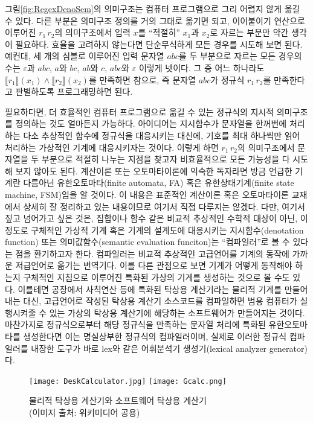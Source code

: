 그림\;\ref{fig:RegexDenoSem}의 의미구조는 컴퓨터 프로그램으로 그리
어렵지 않게 옮길 수 있다. 다른 부분은 의미구조 정의를 거의 그대로
옮기면 되고, 이이붙이기 연산으로 이루어진 $r_1\,r_2$의 의미구조에서
입력 $x$를 ``적절히'' $x_1$과 $x_2$로 자르는 부분만 약간 생각이 필요하다.
효율을 고려하지 않는다면 단순무식하게 모든 경우를 시도해 보면 된다.
예컨대, 세 개의 심볼로 이루어진 입력 문자열 $abc$를 두 부분으로 자르는
모든 경우의 수는 $\varepsilon$과 $abc$, $a$와 $bc$, $ab$와 $c$, $abc$와
$\varepsilon$ 이렇게 넷이다. 그 중 어느 하나라도
$\llbracket r_1\rrbracket(x_1) \land \llbracket r_2\rrbracket(x_2)$를
만족하면 참으로, 즉 문자열 $abc$가 정규식 $r_1\,r_2$를 만족한다고
판별하도록 프로그래밍하면 된다.

필요하다면, 더 효율적인 컴퓨터 프로그램으로 옮길 수 있는 정규식의
지시적 의미구조를 정의하는 것도 얼마든지 가능하다. 아이디어는
지시함수가 문자열을 한꺼번에 처리하는 다소 추상적인 함수에 정규식을
대응시키는 대신에, 기호를 최대 하나씩만 읽어 처리하는 가상적인 기계에
대응시키자는 것이다. 이렇게 하면 $r_1\,r_2$의 의미구조에서 문자열을
두 부분으로 적절히 나누는 지점을 찾고자 비효율적으로 모든 가능성을
다 시도해 보지 않아도 된다. 계산이론 또는 오토마타이론에 익숙한 독자라면
방금 언급한 기계란 다름아닌 유한오토마타(finite automata, FA) 혹은
유한상태기계(finite state machine, FSM)임을 알 것이다. 이 내용은
표준적인 계산이론 혹은 오토마타이론 교재\cite{Sipser2013,Hopcroft2007}에서
상세히 잘 정리하고 있는 내용이므로 여기서 직접 다루지는 않겠다.
다만, 여기서 짚고 넘어가고 싶은 것은, 집합이나 함수 같은 비교적
추상적인 수학적 대상이 아닌, 이정도로 구체적인 가상적 기계 혹은
기계의 설계도에 대응시키는 지시함수(denotation function) 또는
의미값함수(semantic evaluation funciton)는 ``컴파일러''로
볼 수 있다는 점을 환기하고자 한다. 컴파일러는 비교적 추상적인
고급언어를 기계의 동작에 가까운 저급언어로 옮기는 번역기다.
이를 다른 관점으로 보면 기계가 어떻게 동작해야 하는지 구체적인
지침으로 이루어진 특화된 가상의 기계를 생성하는 것으로 볼 수도 있다.
이를테면 공장에서 사칙연산 등에 특화된 탁상용 계산기라는 물리적 기계를
만들어내는 대신, 고급언어로 작성된 탁상용 계산기 소스코드를 컴파일하면
범용 컴퓨터가 실행시켜줄 수 있는 가상의 탁상용 계산기에 해당하는
소프트웨어가 만들어지는 것이다. 마찬가지로 정규식으로부터 해당 정규식을
만족하는 문자열 처리에 특화된 유한오토마타를 생성한다면
이는 명실상부한 정규식의 컴파일러이며, 실제로 이러한 정규식 컴파일러를
내장한 도구가 바로 lex\cite{lex1990}와 같은
어휘분석기 생성기(lexical analyzer generator)다.

\begin{figure}\centering
\texttt{[image: DeskCalculator.jpg]}\qquad
\texttt{[image: Gcalc.png]}\qquad\qquad
\caption{물리적 탁상용 계산기와 소프트웨어 탁상용 계산기\\
         {\scriptsize(이미지 출처: 위키미디어 공용)}}
\end{figure}

